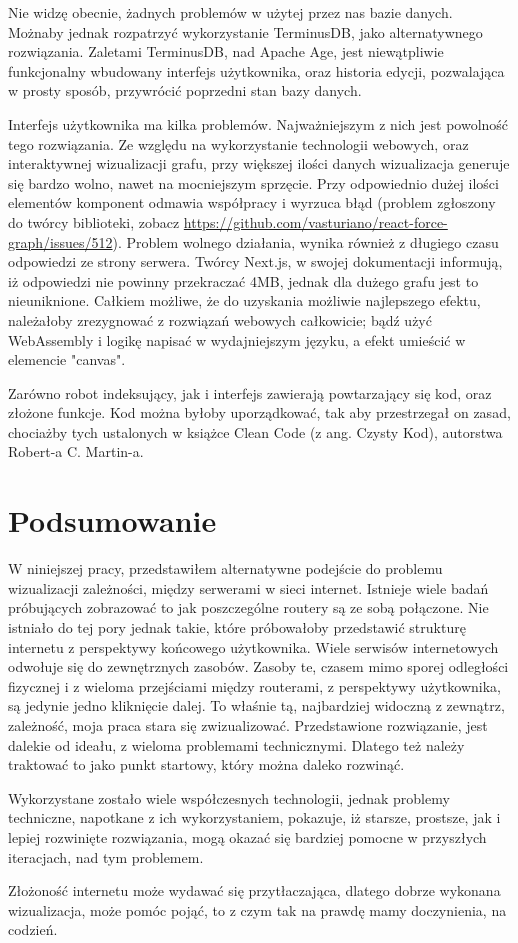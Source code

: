\documentclass[a4paper, 12pt]{article}
\begin{document}
Nie widzę obecnie, żadnych problemów w użytej przez nas bazie danych. Możnaby jednak rozpatrzyć wykorzystanie TerminusDB, jako alternatywnego rozwiązania. Zaletami TerminusDB, nad Apache Age, jest niewątpliwie funkcjonalny wbudowany interfejs użytkownika, oraz historia edycji, pozwalająca w prosty sposób, przywrócić poprzedni stan bazy danych.

Interfejs użytkownika ma kilka problemów. Najważniejszym z nich jest powolność tego rozwiązania. Ze względu na wykorzystanie technologii webowych, oraz interaktywnej wizualizacji grafu, przy większej ilości danych wizualizacja generuje się bardzo wolno, nawet na mocniejszym sprzęcie. Przy odpowiednio dużej ilości elementów komponent odmawia współpracy i wyrzuca błąd (problem zgłoszony do twórcy biblioteki, zobacz \url{https://github.com/vasturiano/react-force-graph/issues/512}). Problem wolnego działania, wynika również z długiego czasu odpowiedzi ze strony serwera. Twórcy Next.js, w swojej dokumentacji informują, iż odpowiedzi nie powinny przekraczać 4MB, jednak dla dużego grafu jest to nieuniknione.\cite{nextDoc4MB} Całkiem możliwe, że do uzyskania możliwie najlepszego efektu, należałoby zrezygnować z rozwiązań webowych całkowicie; bądź użyć WebAssembly i logikę napisać w wydajniejszym języku, a efekt umieścić w elemencie "canvas".

Zarówno robot indeksujący, jak i interfejs zawierają powtarzający się kod, oraz złożone funkcje. Kod można byłoby uporządkować, tak aby przestrzegał on zasad, chociażby tych ustalonych w książce Clean Code (z ang. Czysty Kod), autorstwa Robert-a C. Martin-a.

\section{Podsumowanie}
W niniejszej pracy, przedstawiłem alternatywne podejście do problemu wizualizacji zależności, między serwerami w sieci internet. Istnieje wiele badań próbujących zobrazować to jak poszczególne routery są ze sobą połączone. Nie istniało do tej pory jednak takie, które próbowałoby przedstawić strukturę internetu z perspektywy końcowego użytkownika. Wiele serwisów internetowych odwołuje się do zewnętrznych zasobów. Zasoby te, czasem mimo sporej odległości fizycznej i z wieloma przejściami między routerami, z perspektywy użytkownika, są jedynie jedno kliknięcie dalej. To właśnie tą, najbardziej widoczną z zewnątrz, zależność, moja praca stara się zwizualizować. Przedstawione rozwiązanie, jest dalekie od ideału, z wieloma problemami technicznymi. Dlatego też należy traktować to jako punkt startowy, który można daleko rozwinąć.

Wykorzystane zostało wiele współczesnych technologii, jednak problemy techniczne, napotkane z ich wykorzystaniem, pokazuje, iż starsze, prostsze, jak i lepiej rozwinięte rozwiązania, mogą okazać się bardziej pomocne w przyszłych iteracjach, nad tym problemem.

Złożoność internetu może wydawać się przytłaczająca, dlatego dobrze wykonana wizualizacja, może pomóc pojąć, to z czym tak na prawdę mamy doczynienia, na codzień.

\printbibliography
\listoffigures
\end{document}
